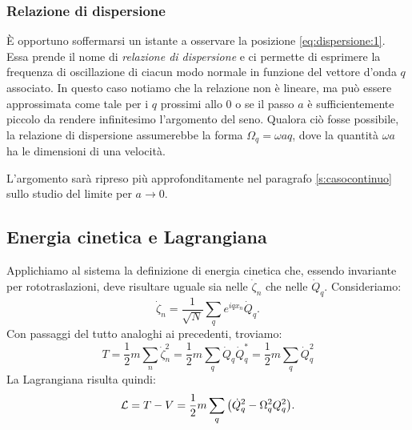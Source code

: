         \subsubsection{Relazione di dispersione}
            \`E opportuno soffermarsi un istante a osservare la posizione \eqref{eq:dispersione:1}. Essa prende il nome di \emph{relazione di dispersione} e ci permette di esprimere la frequenza di oscillazione di ciacun modo normale in funzione del vettore d'onda $q$ associato. In questo caso notiamo che la relazione non \`e lineare, ma pu\`o essere approssimata come tale per i $q$ prossimi allo $0$ o se il passo $a$ \`e sufficientemente piccolo da rendere infinitesimo l'argomento del seno. Qualora ci\`o fosse possibile, la relazione di dispersione assumerebbe la forma $\Omega_q=\omega aq$, dove la quantit\`a $\omega a$ ha le dimensioni di una velocit\`a. \par L'argomento sar\`a ripreso pi\`u approfonditamente nel paragrafo \ref{s:casocontinuo} sullo studio del limite per $a\to 0$.
    \subsection{Energia cinetica e Lagrangiana}
        Applichiamo al sistema la definizione di energia cinetica che, essendo invariante per rototraslazioni, deve risultare uguale sia nelle $\dot{\zeta}_n$ che nelle $\dot{Q}_q$. Consideriamo:
            $$\dot{\zeta}_n=\frac{1}{\sqrt{N}}\sum_qe^{iqx_n}\dot{Q}_q.$$
        Con passaggi del tutto analoghi ai precedenti, troviamo:
            $$T=\frac{1}{2}m\sum_n\dot{\zeta}_n^2=\frac{1}{2}m\sum_q\dot{Q}_q\dot{Q}^*_q=\frac{1}{2}m\sum_q\dot{Q}_q^2$$
        La Lagrangiana risulta quindi:
        \begin{equation}
            \mathcal{L}=T-V=\frac{1}{2}m\sum_q\qty(\dot{Q}_q^2-\Omega_q^2Q_q^2).
            \label{eq:mollelagrangiana}
        \end{equation}
